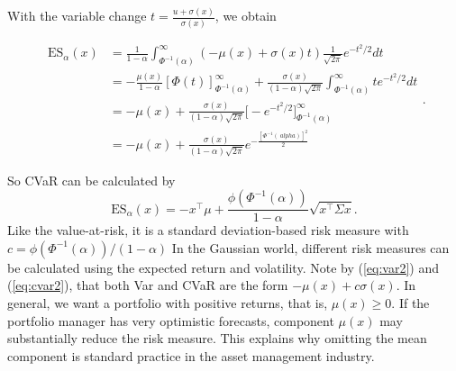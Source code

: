 With the variable change
$t=\frac{u+\sigma(x)}{\sigma(x)}$, we obtain

\[
	\begin{aligned}
		\mbox{ES}_\alpha(x) & = \frac{1}{1-\alpha}\int_{\Phi^{-1}(\alpha)}^\infty (-\mu(x)+ \sigma(x)t) \frac{1}{\sqrt{2\pi}} e^{-t^2/2}dt \\
		                    & = -\frac{\mu(x)}{1-\alpha}[\Phi(t)]_{\Phi^{-1}(\alpha)}^\infty +
		\frac{\sigma(x)}{(1-\alpha)\sqrt{2\pi}}\int_{\Phi^{-1}(\alpha)}^\infty t e^{-t^2/ 2}dt                                             \\
		                    & =-\mu(x) + \frac{\sigma(x)}{(1-\alpha)\sqrt{2\pi}}\Big[-e^{-t^2/2} \Big] _{\Phi^{-1}(\alpha)}^\infty         \\
		                    & = -\mu(x) + \frac{\sigma(x)}{(1-\alpha)\sqrt{2\pi}}e^{-\frac{[\Phi^{-1}(\ alpha)]^2}{2}}
	\end{aligned}.
\]

So CVaR can be calculated by
\begin{equation}\label{eq:cvar2}
	\mbox{ES}_\alpha(x)=-x^\top \mu + \frac{\phi(\Phi^{-1}(\alpha))}{1-\alpha}\sqrt{x^ \top \Sigma x}.
\end{equation}
Like the value-at-risk, it is a standard deviation-based risk measure with $c ={\phi(\Phi^{-1}(\alpha))}/{(1-\alpha)}$
In the Gaussian world, different risk measures can be calculated using the expected return and volatility. Note by (\ref{eq:var2}) and (\ref{eq:cvar2}), that both Var and CVaR are the form $-\mu(x)+c\sigma(x)$. In general, we want a portfolio with positive returns, that is, $\mu(x)\geq0$. If the portfolio manager has very optimistic forecasts, component $\mu(x)$ may substantially reduce the risk measure. This explains why omitting the mean component is standard practice in the asset management industry.

